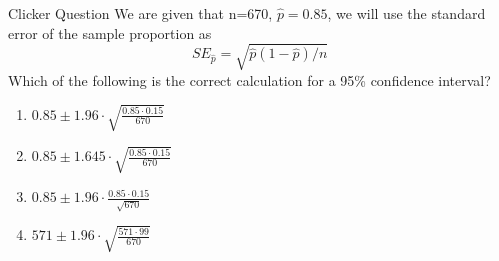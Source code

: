 \documentclass{beamer}
\begin{document}
	

	
	



%


\begin{frame}{Clicker Question}
	We are given that n=670, $\hat{p}=0.85$, we will use the standard error of the sample proportion as
	$$SE_{\hat{p}}=\sqrt{\hat{p}(1-\hat{p})/n}$$
	Which of the following is the correct calculation for a 95\% confidence interval?
	\begin{enumerate}[label=(\alph*)]
		\item $0.85 \pm 1.96 \cdot \sqrt{\frac{0.85\cdot 0.15}{670}}$ %
		\item $0.85 \pm 1.645 \cdot \sqrt{\frac{0.85\cdot 0.15}{670}}$
		\item $0.85 \pm 1.96 \cdot \frac{0.85\cdot 0.15}{\sqrt{670}}$
		\item $571 \pm 1.96 \cdot \sqrt{\frac{571\cdot 99}{670}}$
	\end{enumerate}
\end{frame}
\end{document}
